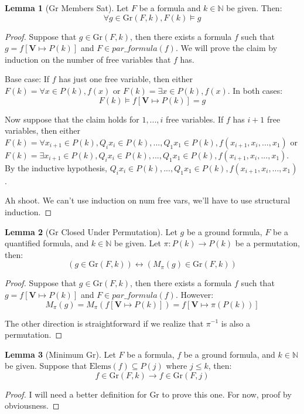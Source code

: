 \documentclass[12pt]{article}
\theoremstyle{definition}
\newtheorem{lemma}{Lemma}
\theoremstyle{remark}
\newcommand{\gr}{\text{Gr}}
\newcommand{\elems}{\text{Elems}}
\begin{document}
\begin{lemma}[Gr Members Sat]
  \label{lem:gr-sat}
  Let $F$ be a formula and $k \in \mathbb{N}$ be given.  Then:
  $$\forall g \in \gr(F,k), F(k) \models g$$
\end{lemma}
\begin{proof}
  Suppose that $g \in \gr(F,k)$, then there exists a formula $f$ such that $g = f[\mathbf{V} \mapsto P(k)]$ and $F \in par\_formula(f)$.  We will prove the claim by induction on the number of free variables that $f$ has.

  Base case: If $f$ has just one free variable, then either $F(k) = \forall x \in P(k), f(x)$ or $F(k) = \exists x \in P(k), f(x)$.  In both cases:
  $$F(k) \models f[\mathbf{V} \mapsto P(k)] = g$$

  Now suppose that the claim holds for $1,...,i$ free variables.  If $f$ has $i+1$ free variables, then either $F(k) = \forall x_{i+1} \in P(k), Q_i x_i \in P(k), ..., Q_1 x_1 \in P(k), f(x_{i+1},x_i,...,x_1)$ or $F(k) = \exists x_{i+1} \in P(k), Q_i x_i \in P(k), ..., Q_1 x_1 \in P(k), f(x_{i+1},x_i,...,x_1)$.  By the inductive hypothesis, $Q_i x_i \in P(k), ..., Q_1 x_1 \in P(k), f(x_{i+1},x_i,...,x_1)$.

  Ah shoot.  We can't use induction on num free vars, we'll have to use structural induction.
\end{proof}

\begin{lemma}[Gr Closed Under Permutation]
  \label{lem:gr-closed}
  Let $g$ be a ground formula, $F$ be a quantified formula, and $k \in \mathbb{N}$ be given.  Let $\pi : P(k) \to P(k)$ be a permutation, then:
  $$(g \in \gr(F,k)) \leftrightarrow (M_\pi(g) \in \gr(F,k))$$
\end{lemma}
\begin{proof}
  Suppose that $g \in \gr(F,k)$, then there exists a formula $f$ such that $g = f[\mathbf{V} \mapsto P(k)]$ and $F \in par\_formula(f)$.  However:
  $$M_\pi(g) = M_\pi(f[\mathbf{V} \mapsto P(k)]) = f[\mathbf{V} \mapsto \pi(P(k))]$$

  The other direction is straightforward if we realize that $\pi^{-1}$ is also a permutation.
\end{proof}

\begin{lemma}[Minimum Gr]
  \label{lem:min-gr}
  Let $F$ be a formula, $f$ be a ground formula, and $k \in \mathbb{N}$ be given.  Suppose that $\elems(f) \subseteq P(j)$ where $j \leq k$, then:
  $$f \in \gr(F,k) \rightarrow f \in \gr(F,j)$$
\end{lemma}
\begin{proof}
  I will need a better definition for $\gr$ to prove this one.  For now, proof by obviousness.
\end{proof}
\end{document}
